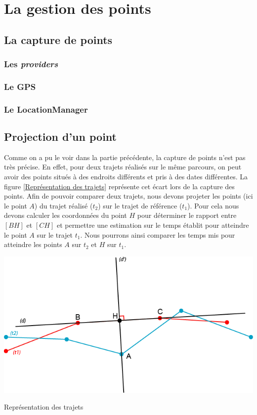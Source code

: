 \chapter{La gestion des points}

\section{La capture de points}
\subsection{Les \textit{providers}}
\subsection{Le GPS}
\subsection{Le LocationManager}
\label{locationManager}
\section{Projection d'un point}
Comme on a pu le voir dans la partie précédente, la capture de points n'est pas très précise. En effet, pour deux trajets réalisés sur le même parcours, on peut avoir des points situés à des endroits différents et pris à des dates différentes. La figure \ref{Représentation des trajets} représente cet écart lors de la capture des points. Afin de pouvoir comparer deux trajets, nous devons projeter les points (ici le point $A$) du trajet réalisé ($t_2$) sur le trajet de référence ($t_1$). Pour cela nous devons calculer les coordonnées du point $H$ pour déterminer le rapport entre $[BH]$ et $[CH]$ et permettre une estimation sur le temps établit pour atteindre le point $A$ sur le trajet $t_1$. Nous pourrons ainsi comparer les temps mis pour atteindre les points $A$ sur $t_2$ et $H$ sur $t_1$.

\begin{img}  
	\includegraphics[scale=1]{img/Trajet.png}
	\caption{Représentation des trajets}
	\label{Représentation des trajets}
\end{img}


